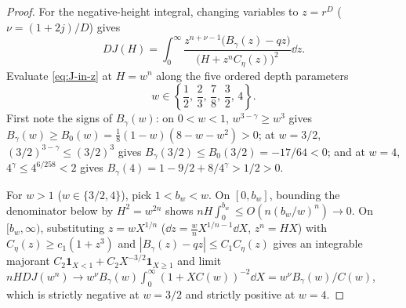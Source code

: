 \begin{proof}
For the negative-height integral, changing variables to $z=r^D$ ($\nu=(1+2j)/D$) gives
\begin{equation}\label{eq:J-in-z}
  D J(H) = \int_0^\infty \frac{z^{n+\nu-1}\bigl(B_\gamma(z) - qz\bigr)}{\bigl(H + z^n C_\eta(z)\bigr)^2}\dd z.
\end{equation}
Evaluate \eqref{eq:J-in-z} at $H=w^n$ along the five ordered depth parameters
\[
  w \in \left\{\frac{1}{2},\, \frac{2}{3},\, \frac{7}{8},\, \frac{3}{2},\, 4\right\}.
\]
First note the signs of $B_\gamma(w)$: on $0<w<1$, $w^{3-\gamma}\ge w^3$ gives $B_\gamma(w)\ge
B_0(w)=\frac{1}{8}(1-w)(8-w-w^2)>0$; at $w=3/2$, $(3/2)^{3-\gamma}\le(3/2)^3$ gives $B_\gamma(3/2)\le
B_0(3/2)=-17/64<0$; and at $w=4$, $4^\gamma\le 4^{6/258}<2$ gives
$B_\gamma(4)=1-9/2+8/4^\gamma>1/2>0$.

For $w>1$ ($w\in\{3/2,4\}$), pick $1<b_w<w$. On $[0,b_w]$, bounding the denominator below by
$H^2=w^{2n}$ shows $nH\int_0^{b_w}\le O(n(b_w/w)^n)\to 0$. On $[b_w,\infty)$, substituting
$z=wX^{1/n}$ ($\dd z=\frac{w}{n}X^{1/n-1}\dd X$, $z^n=HX$) with $C_\eta(z)\ge c_1(1+z^3)$ and
$|B_\gamma(z)-qz|\le C_1 C_\eta(z)$ gives an integrable majorant $C_2\mathbf{1}_{X<1}+C_2
X^{-3/2}\mathbf{1}_{X\ge 1}$ and limit $nHDJ(w^n)\to w^\nu B_\gamma(w)\int_0^\infty(1+XC(w))^{-2}\dd X
= w^\nu B_\gamma(w)/C(w)$, which is strictly negative at $w=3/2$ and strictly positive at $w=4$.


\end{proof}
